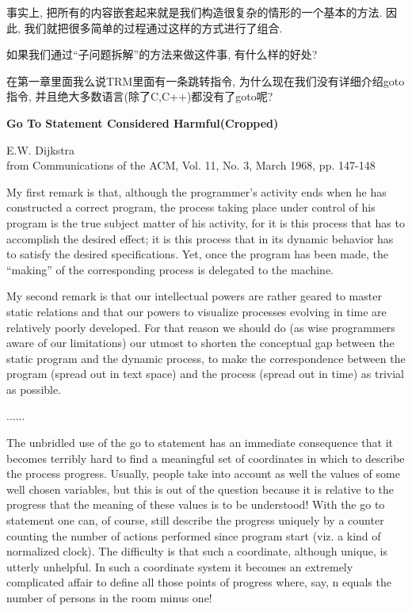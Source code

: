 事实上, 把所有的内容嵌套起来就是我们构造很复杂的情形的一个基本的方法. 因此, 我们就把很多简单的过程通过这样的方式进行了组合. 

如果我们通过``子问题拆解''的方法来做这件事, 有什么样的好处? 

\begin{bonus}
	在第一章里面我么说TRM里面有一条跳转指令, 为什么现在我们没有详细介绍goto指令, 并且绝大多数语言(除了C,C++)都没有了goto呢?
\end{bonus}


\newpage
\begin{pas}
	\begin{center}
		\large \textbf{Go To Statement Considered Harmful(Cropped)}
	\end{center}
	\begin{center}
		E.W. Dijkstra\\
		from Communications of the ACM, Vol. 11, No. 3, March 1968, pp. 147-148
	\end{center}
	My first remark is that, although the programmer's activity ends when he has constructed a correct program, the process taking place under control of his program is the true subject matter of his activity, for it is this process that has to accomplish the desired effect; it is this process that in its dynamic behavior has to satisfy the desired specifications. Yet, once the program has been made, the ``making'' of the corresponding process is delegated to the machine.
	
	My second remark is that our intellectual powers are rather geared to master static relations and that our powers to visualize processes evolving in time are relatively poorly developed. For that reason we should do (as wise programmers aware of our limitations) our utmost to shorten the conceptual gap between the static program and the dynamic process, to make the correspondence between the program (spread out in text space) and the process (spread out in time) as trivial as possible.
	
	......
	
	The unbridled use of the go to statement has an immediate consequence that it becomes terribly hard to find a meaningful set of coordinates in which to describe the process progress. Usually, people take into account as well the values of some well chosen variables, but this is out of the question because it is relative to the progress that the meaning of these values is to be understood! With the go to statement one can, of course, still describe the progress uniquely by a counter counting the number of actions performed since program start (viz. a kind of normalized clock). The difficulty is that such a coordinate, although unique, is utterly unhelpful. In such a coordinate system it becomes an extremely complicated affair to define all those points of progress where, say, n equals the number of persons in the room minus one!


\end{pas}
